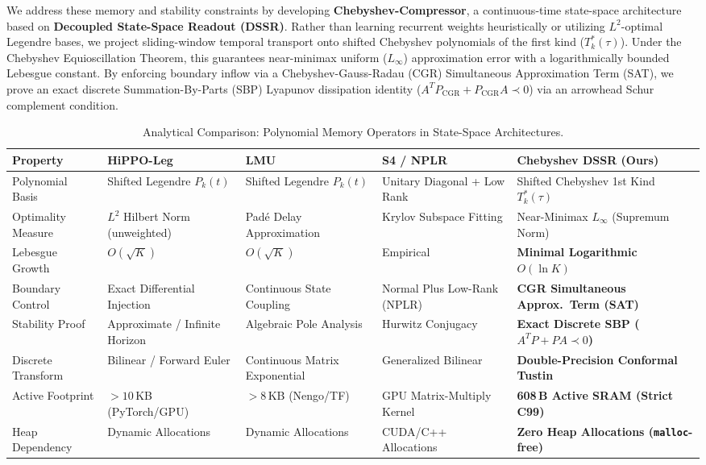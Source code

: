 \documentclass[10pt,twocolumn,a4paper]{article}
\theoremstyle{plain}
\theoremstyle{definition}
\begin{document}
We address these memory and stability constraints by developing \textbf{Chebyshev-Compressor}, a continuous-time state-space architecture based on \textbf{Decoupled State-Space Readout (DSSR)}. Rather than learning recurrent weights heuristically or utilizing $L^2$-optimal Legendre bases, we project sliding-window temporal transport onto shifted Chebyshev polynomials of the first kind ($T_k^*(\tau)$). Under the Chebyshev Equioscillation Theorem, this guarantees near-minimax uniform ($L_\infty$) approximation error with a logarithmically bounded Lebesgue constant. By enforcing boundary inflow via a Chebyshev-Gauss-Radau (CGR) Simultaneous Approximation Term (SAT), we prove an exact discrete Summation-By-Parts (SBP) Lyapunov dissipation identity ($A^T P_{\mathrm{CGR}} + P_{\mathrm{CGR}} A \prec 0$) via an arrowhead Schur complement condition.

\begin{table}[t]
\centering
\caption{Analytical Comparison: Polynomial Memory Operators in State-Space Architectures.}
\label{tab:ssm_comparison}
\footnotesize
\setlength{\tabcolsep}{4pt}
\begin{tabularx}{\textwidth}{@{}l>{\raggedright\arraybackslash}X>{\raggedright\arraybackslash}X>{\raggedright\arraybackslash}X>{\raggedright\arraybackslash}p{4.35cm}@{}}
\toprule
\textbf{Property} & \textbf{HiPPO-Leg \cite{gu2020hippo}} & \textbf{LMU \cite{voelker2019legendre}} & \textbf{S4 / NPLR \cite{gu2022s4}} & \textbf{Chebyshev DSSR (Ours)} \\
\midrule
Polynomial Basis & Shifted Legendre $P_k(t)$ & Shifted Legendre $P_k(t)$ & Unitary Diagonal + Low Rank & Shifted Chebyshev 1st Kind $T_k^*(\tau)$ \\
Optimality Measure & $L^2$ Hilbert Norm (unweighted) & Pad\'e Delay Approximation & Krylov Subspace Fitting & Near-Minimax $L_\infty$ (Supremum Norm) \\
Lebesgue Growth & $O(\sqrt{K})$ & $O(\sqrt{K})$ & Empirical & \textbf{Minimal Logarithmic} $O(\ln K)$ \\
Boundary Control & Exact Differential Injection & Continuous State Coupling & Normal Plus Low-Rank (NPLR) & \textbf{CGR Simultaneous Approx.\ Term (SAT)} \\
Stability Proof & Approximate / Infinite Horizon & Algebraic Pole Analysis & Hurwitz Conjugacy & \textbf{Exact Discrete SBP ($A^T P + P A \prec 0$)} \\
Discrete Transform & Bilinear / Forward Euler & Continuous Matrix Exponential & Generalized Bilinear & \textbf{Double-Precision Conformal Tustin} \\
Active Footprint & $>10$\,KB (PyTorch/GPU) & $>8$\,KB (Nengo/TF) & GPU Matrix-Multiply Kernel & \textbf{608\,B Active SRAM (Strict C99)} \\
Heap Dependency & Dynamic Allocations & Dynamic Allocations & CUDA/C++ Allocations & \textbf{Zero Heap Allocations (\texttt{malloc}-free)} \\
\bottomrule
\end{tabularx}
\end{table}
\end{document}
